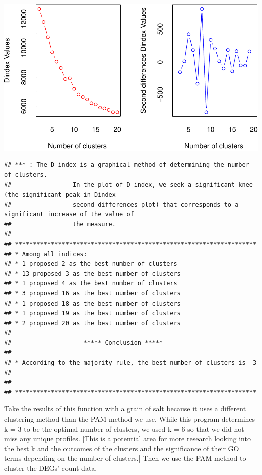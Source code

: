 \documentclass[]{article}
\begin{document}
\includegraphics{EcoliTechnicalReport_files/figure-latex/calc optimal k-2.pdf}

\begin{verbatim}
## *** : The D index is a graphical method of determining the number of clusters. 
##                 In the plot of D index, we seek a significant knee (the significant peak in Dindex
##                 second differences plot) that corresponds to a significant increase of the value of
##                 the measure. 
##  
## ******************************************************************* 
## * Among all indices:                                                
## * 1 proposed 2 as the best number of clusters 
## * 13 proposed 3 as the best number of clusters 
## * 1 proposed 4 as the best number of clusters 
## * 3 proposed 16 as the best number of clusters 
## * 1 proposed 18 as the best number of clusters 
## * 1 proposed 19 as the best number of clusters 
## * 2 proposed 20 as the best number of clusters 
## 
##                    ***** Conclusion *****                            
##  
## * According to the majority rule, the best number of clusters is  3 
##  
##  
## *******************************************************************
\end{verbatim}

Take the results of this function with a grain of salt because it uses a
different clustering method than the PAM method we use. While this
program determines k = 3 to be the optimal number of clusters, we used k
= 6 so that we did not miss any unique profiles. {[}This is a potential
area for more research looking into the best k and the outcomes of the
clusters and the significance of their GO terms depending on the number
of clusters.{]} Then we use the PAM method to cluster the DEGs' count
data.
\end{document}
